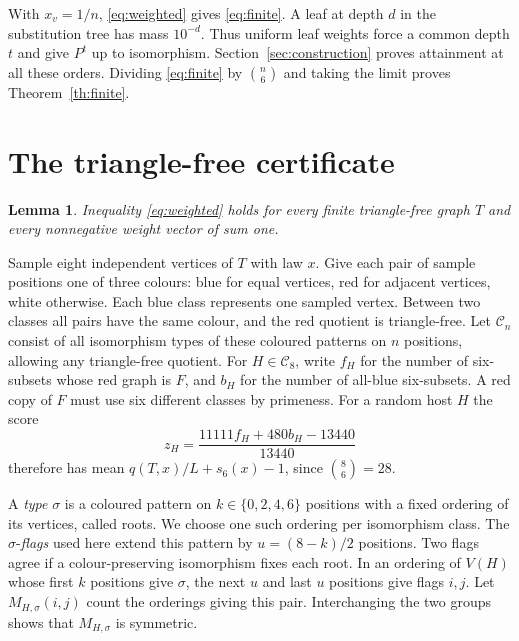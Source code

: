 \documentclass[11pt,a4paper]{article}
\newtheorem{lemma}[theorem]{Lemma}
\begin{document}
With \(x_v=1/n\), \eqref{eq:weighted} gives \eqref{eq:finite}. A leaf at depth \(d\) in the substitution tree has mass \(10^{-d}\). Thus uniform leaf weights force a common depth \(t\) and give \(P^t\) up to isomorphism. Section~\ref{sec:construction} proves attainment at all these orders. Dividing \eqref{eq:finite} by \(\binom n6\) and taking the limit proves Theorem~\ref{th:finite}.

\section{The triangle-free certificate}\label{sec:colour}

\begin{lemma}\label{lem:tf}
Inequality \eqref{eq:weighted} holds for every finite triangle-free graph \(T\) and every nonnegative weight vector of sum one.
\end{lemma}

Sample eight independent vertices of \(T\) with law \(x\). Give each pair of sample positions one of three colours: blue for equal vertices, red for adjacent vertices, white otherwise. Each blue class represents one sampled vertex. Between two classes all pairs have the same colour, and the red quotient is triangle-free. Let \(\mathcal C_n\) consist of all isomorphism types of these coloured patterns on \(n\) positions, allowing any triangle-free quotient. For \(H\in\mathcal C_8\), write \(f_H\) for the number of six-subsets whose red graph is \(F\), and \(b_H\) for the number of all-blue six-subsets. A red copy of \(F\) must use six different classes by primeness. For a random host \(H\) the score
\begin{equation}\label{eq:z}
 z_H=\frac{11111 f_H+480 b_H-13440}{13440}
\end{equation}
therefore has mean \(q(T,x)/L+s_6(x)-1\), since \(\binom86=28\).

A \emph{type} \(\sigma\) is a coloured pattern on \(k\in\{0,2,4,6\}\) positions with a fixed ordering of its vertices, called roots. We choose one such ordering per isomorphism class. The \(\sigma\)-\emph{flags} used here extend this pattern by \(u=(8-k)/2\) positions. Two flags agree if a colour-preserving isomorphism fixes each root. In an ordering of \(V(H)\) whose first \(k\) positions give \(\sigma\), the next \(u\) and last \(u\) positions give flags \(i,j\). Let \(M_{H,\sigma}(i,j)\) count the orderings giving this pair. Interchanging the two groups shows that \(M_{H,\sigma}\) is symmetric.
\end{document}
